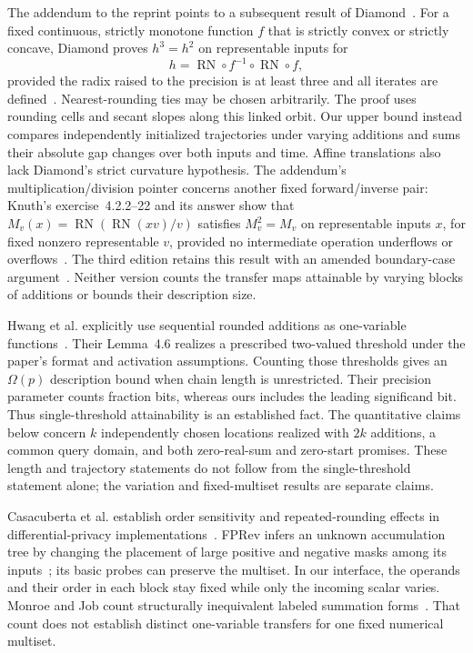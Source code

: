 \documentclass[11pt,reqno]{amsart}
\theoremstyle{definition}
\theoremstyle{remark}
\numberwithin{equation}{section}
\DeclareMathOperator{\RN}{RN}
\begin{document}
The addendum to the reprint points to a subsequent result of
Diamond~\cite[p.~348]{ref18}. For a fixed continuous, strictly monotone function
$f$ that is strictly convex or strictly concave, Diamond proves $h^3=h^2$ on representable inputs for
\[
 h=\RN\circ f^{-1}\circ\RN\circ f,
\]
provided the radix raised to the precision is at least three and all iterates
are defined~\cite[pp.~228--232]{ref19}. Nearest-rounding ties may be chosen
arbitrarily. The proof uses rounding cells and secant slopes along this linked
orbit. Our upper bound instead compares independently initialized trajectories
under varying additions and sums their absolute gap changes over both inputs
and time. Affine translations also lack Diamond's strict curvature
hypothesis. The addendum's multiplication/division pointer concerns another
fixed forward/inverse pair: Knuth's exercise~4.2.2--22 and its answer show
that $M_v(x)=\RN(\RN(xv)/v)$ satisfies $M_v^2=M_v$ on representable inputs
$x$, for fixed nonzero representable $v$, provided no intermediate operation
underflows or overflows~\cite[pp.~229 and~573]{ref23}. The third edition
retains this result with an amended boundary-case
argument~\cite[pp.~244 and~616]{ref20}. Neither version counts the transfer
maps attainable by varying blocks of additions or bounds their description
size.

Hwang et al. explicitly use sequential rounded additions as one-variable
functions~\cite[Definition~4.3]{hwang2025}. Their Lemma~4.6 realizes a
prescribed two-valued threshold under the paper's format and activation
assumptions. Counting those thresholds gives an $\Omega(p)$ description
bound when chain length is unrestricted. Their precision parameter counts
fraction bits, whereas ours includes the leading significand bit. Thus
single-threshold attainability is an established fact. The quantitative
claims below concern $k$ independently chosen locations realized with
$2k$ additions, a common query domain, and both zero-real-sum and zero-start
promises. These length and trajectory statements do not follow from the
single-threshold statement alone; the variation and fixed-multiset results
are separate claims.

Casacuberta et al. establish order sensitivity and repeated-rounding effects
in differential-privacy implementations~\cite[Sections~5.3, 5.5, and~5.6]{ref10}.
FPRev infers an unknown accumulation tree by changing the placement of large
positive and negative masks among its inputs~\cite{ref11}; its basic probes
can preserve the multiset. In our interface, the operands and their order in
each block stay fixed while only the incoming scalar varies. Monroe and Job
count structurally inequivalent labeled summation
forms~\cite[Sections~2.1 and~6.1, Proposition~27]{ref17}. That count does not
establish distinct one-variable transfers for one fixed numerical multiset.
\end{document}
